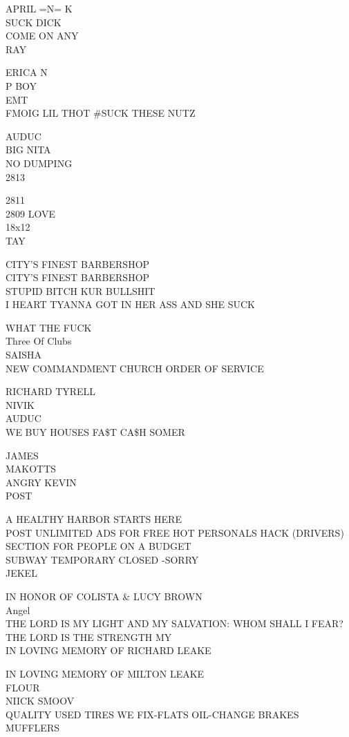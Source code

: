 \documentclass[10pt,letterpaper]{article}
\begin{document}
APRIL =N= K\\
SUCK DICK\\
COME ON ANY\\
RAY

ERICA N\\
P BOY\\
EMT\\
FMOIG LIL THOT \#SUCK THESE NUTZ

AUDUC\\
BIG NITA\\
NO DUMPING\\
2813

2811\\
2809 LOVE\\
18x12\\
TAY

CITY'S FINEST BARBERSHOP\\
CITY'S FINEST BARBERSHOP\\
STUPID BITCH KUR BULLSHIT\\
I HEART TYANNA GOT IN HER ASS AND SHE SUCK

WHAT THE FUCK\\
Three Of Clubs\\
SAISHA\\
NEW COMMANDMENT CHURCH ORDER OF SERVICE

RICHARD TYRELL\\
NIVIK\\
AUDUC\\
WE BUY HOUSES FA\$T CA\$H SOMER

JAMES\\
MAKOTTS\\
ANGRY KEVIN\\
POST

A HEALTHY HARBOR STARTS HERE\\
POST UNLIMITED ADS FOR FREE HOT PERSONALS HACK (DRIVERS) SECTION FOR PEOPLE ON A BUDGET\\
SUBWAY TEMPORARY CLOSED {-}SORRY\\
JEKEL

IN HONOR OF COLISTA \& LUCY BROWN\\
Angel\\
THE LORD IS MY LIGHT AND MY SALVATION: WHOM SHALL I FEAR?  THE LORD IS THE STRENGTH MY\\
IN LOVING MEMORY OF RICHARD LEAKE

IN LOVING MEMORY OF MILTON LEAKE\\
FLOUR\\
NIICK SMOOV\\
QUALITY USED TIRES WE FIX{-}FLATS OIL{-}CHANGE BRAKES MUFFLERS
\end{document}
